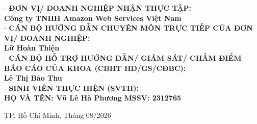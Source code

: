 \documentclass[a4paper]{article}
\theoremstyle{definition}
\begin{document}
\begin{titlepage}
\begin{flushleft}
    {\fontsize{15pt}{18pt}\selectfont 
    - \textbf{ĐƠN VỊ/ DOANH NGHIỆP NHẬN THỰC TẬP:}\\
    \textbf{Công ty TNHH Amazon Web Services Việt Nam}\\
    \vspace{0.3cm}
    - \textbf{CÁN BỘ HƯỚNG DẪN CHUYÊN MÔN TRỰC TIẾP CỦA ĐƠN VỊ/ DOANH NGHIỆP:}\\
    \textbf{Lữ Hoàn Thiện}\\
    \vspace{0.3cm}
    - \textbf{CÁN BỘ HỖ TRỢ HƯỚNG DẪN/ GIÁM SÁT/ CHẤM ĐIỂM BÁO CÁO CỦA KHOA (CBHT HD/GS/CĐBC):}\\
    \textbf{Lê Thị Bảo Thu}\\
    \vspace{0.2cm}
    - \textbf{SINH VIÊN THỰC HIỆN (SVTH):}\\
    \textbf{HỌ VÀ TÊN: Vũ Lê Hà Phương} \hspace{1cm} \textbf{MSSV: 2312765}\\
    }
\end{flushleft}

\vfill

\begin{center}
{\Large TP. Hồ Chí Minh, Tháng 08/2026}
\end{center}
\vspace{0.5cm}

\end{titlepage}

\newpage
\setcounter{secnumdepth}{3}
\setcounter{tocdepth}{3}
\tableofcontents
\newpage





\newpage

\end{document}
